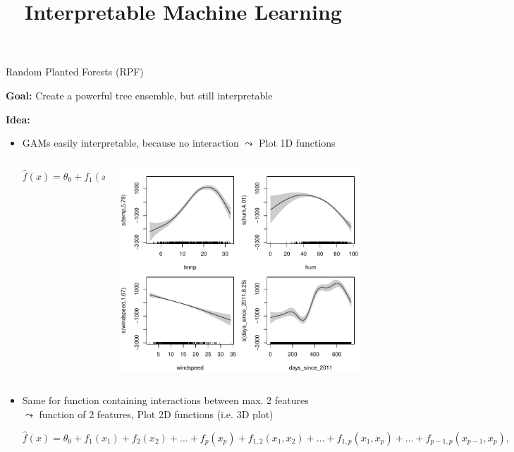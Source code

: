 \documentclass[10pt,compress,t,notes=noshow, xcolor=table]{beamer}
\title{Interpretable Machine Learning}
\date{}
\begin{document}

\begin{frame}{Random Planted Forests (RPF) }

\textbf{Goal:} Create a powerful tree ensemble, but still interpretable

\textbf{Idea:}
\begin{itemize}
    \item GAMs easily interpretable, because no interaction $\leadsto$ Plot 1D functions
    
    \begin{columns}[T, totalwidth=\textwidth]
    \begin{column}{0.5\textwidth}
    $$
    \hat{f}(x) = \theta_0 + f_1(x_{1}) + f_2(x_{2}) + \ldots + f_p(x_{p}),
    $$
    \end{column}
    \hspace*{0.4cm}\hfill
    \centering
    \begin{column}{0.5\textwidth}
    \includegraphics[width = .4\textwidth]{figure/gam_effects.pdf}
    \end{column}
    \end{columns}
    
    \item Same for function containing interactions between max. 2 features 
    \\ $\leadsto$ function of 2 features, Plot 2D functions (i.e. 3D plot)

    $$
    \hat{f}(x) = \theta_0 + f_1(x_{1}) + f_2(x_{2}) + \ldots + f_p(x_{p}) + f_{1,2}(x_{1}, x_{2}) + \ldots + f_{1,p}(x_{1}, x_{p}) + \ldots + f_{p-1,p}(x_{p-1}, x_{p}),
    $$


\end{itemize}
\end{frame}
\end{document}
